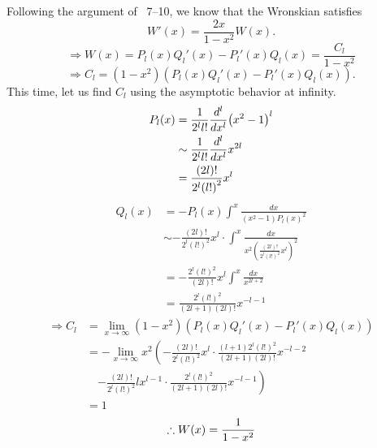 \item

Following the argument of  ~7--10, we know that the Wronskian satisfies
\[
    W'(x) = \frac{2x}{1 - x^2} W(x).
\]
\[
    \Rightarrow W(x)
    = P_l(x) Q_l'(x) - P_l'(x) Q_l(x)
    = \frac{C_l}{1 - x^2}
\]
\[
    \Rightarrow C_l
    = \left( 1 - x^2 \right) \left(
        P_l(x) Q_l'(x) - P_l'(x) Q_l(x)
    \right).
\]
This time, let us find $C_l$ using the asymptotic behavior at infinity.
\begin{align*}
    P_l(x)
    &= \frac{1}{2^l l!} \frac{d^l}{dx^l} {\left( x^2 - 1 \right)}^l \\
    &\sim \frac{1}{2^l l!} \frac{d^l}{dx^l} x^{2l} \\
    &= \frac{(2l)!}{2^l {(l!)}^2} x^{l}
\end{align*}
\begin{align*}
    Q_l(x)
    &= - P_l(x) \int^x \frac{dx}{\left( x^2 - 1 \right) {P_l(x)}^2} \\
    &\sim -\frac{(2l)!}{2^l {(l!)}^2} x^{l} \cdot \int^x \frac{dx}{
        x^2 {\left( \frac{(2l)!}{2^l {(l!)}^2} x^{l} \right)}^2
    } \\
    &= -\frac{2^l {(l!)}^2}{(2l)!} x^l \int^x \frac{dx}{x^{2l+2}} \\
    &= \frac{2^l {(l!)}^2}{(2l + 1) (2l)!} x^{-l-1}
\end{align*}
\begin{align*}
    \Rightarrow C_l
    &= \lim_{x \rightarrow \infty} \left( 1 - x^2 \right) \left(
        P_l(x) Q_l'(x) - P_l'(x) Q_l(x)
    \right) \\
    &= -\lim_{x \rightarrow \infty} x^2 \left(
        -\frac{(2l)!}{2^l {(l!)}^2} x^{l} \cdot \frac{(l + 1) 2^l {(l!)}^2}{(2l + 1) (2l)!} x^{-l-2} 
    \right. \\
    &\quad \left.
        - \frac{(2l)!}{2^l {(l!)}^2} lx^{l - 1} \cdot \frac{2^l {(l!)}^2}{(2l + 1) (2l)!} x^{-l-1}
    \right) \\
    &= 1
\end{align*}
\[
    \therefore W(x) = \frac{1}{1 - x^2}
\]
